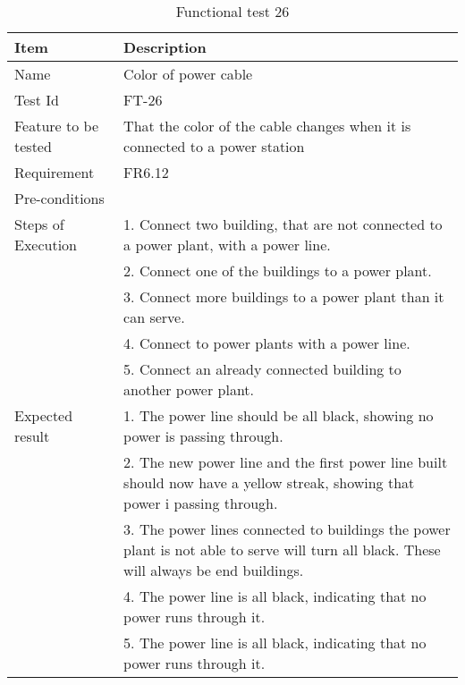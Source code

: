 \begin{table}[H]
\centering
	\begin{tabular}{ l | p{8cm} }
		\hline
		{\bf Item} & {\bf Description} \\ \hline
		Name &  Color of power cable \\ 
		Test Id & FT-26 \\ 
		Feature to be tested & That the color of the cable changes when it is connected to a power station \\ 
		Requirement & FR6.12 \\ 
		Pre-conditions &  \\ 
		Steps of Execution & 1. Connect two building, that are not connected to a power plant, with a power line. \\ 
		& 2. Connect one of the buildings to a power plant. \\
		& 3. Connect more buildings to a power plant than it can serve. \\
		& 4. Connect to power plants with a power line. \\
		& 5. Connect an already connected building to another power plant. \\
		Expected result & 1. The power line should be all black, showing no power is passing through. \\
		& 2. The new power line and the first power line built should now have a yellow streak, showing that power i passing through. \\
		& 3. The power lines connected to buildings the power plant is not able to serve will turn all black. These will always be end buildings. \\
		& 4. The power line is all black, indicating that no power runs through it. \\
		& 5. The power line is all black, indicating that no power runs through it. \\
	\end{tabular}
	\caption{Functional test 26}
\end{table}

